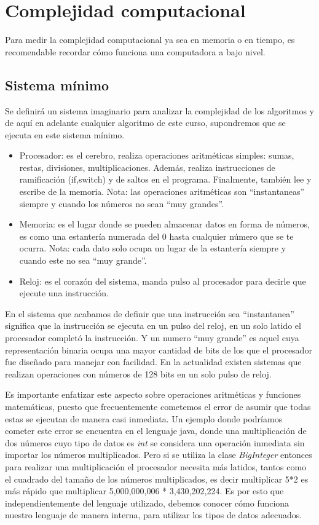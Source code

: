 \chapter{Complejidad computacional}

Para medir la complejidad computacional ya sea en memoria o en tiempo, es recomendable recordar cómo funciona una computadora a bajo nivel.

\section{Sistema mínimo}

 Se definirá un sistema imaginario para analizar la complejidad de los algoritmos y de aquí en adelante cualquier algoritmo de este curso, supondremos que se ejecuta en este sistema mínimo. 

\begin{itemize}
    \item Procesador: es el cerebro, realiza operaciones aritméticas simples: sumas, restas, divisiones, multiplicaciones. Además, realiza instrucciones de ramificación (if,switch) y de saltos en el programa. Finalmente, también lee y escribe de la memoria. Nota: las operaciones aritméticas son ``instantaneas'' siempre y cuando los números no sean ``muy grandes''.
    \item Memoria: es el lugar donde se pueden almacenar datos en forma de números, es como una estantería numerada del 0 hasta cualquier número que se te ocurra. Nota: cada dato solo ocupa un lugar de la estantería siempre y cuando este no sea ``muy grande''.
    \item Reloj: es el corazón del sistema, manda pulso al procesador para decirle que ejecute una instrucción. 
\end{itemize}

En el sistema que acabamos de definir que una instrucción sea ``instantanea'' significa que la instrucción se ejecuta en un pulso del reloj, en un solo latido el procesador completó la instrucción. Y un numero ``muy grande'' es aquel cuya representación binaria ocupa una mayor cantidad de bits de los que el procesador fue diseñado para manejar con facilidad. En la actualidad existen sistemas que realizan operaciones con números de 128 bits en un solo pulso de reloj.

Es importante enfatizar este aspecto sobre operaciones aritméticas y funciones matemáticas, puesto que frecuentemente cometemos el error de asumir que todas estas se ejecutan de manera casi inmediata. Un ejemplo donde podríamos cometer este error se encuentra en el lenguaje java, donde una multiplicación de dos números cuyo tipo de datos es \emph{int} se considera una operación inmediata sin importar los números multiplicados. Pero si se utiliza la clase \emph{BigInteger} entonces para realizar una multiplicación el procesador necesita más latidos, tantos como el cuadrado del tamaño de los números multiplicados, es decir multiplicar 5*2 es más rápido que multiplicar 5,000,000,006 *  3,430,202,224. Es por esto que independientemente del lenguaje utilizado, debemos conocer cómo funciona nuestro lenguaje de manera interna, para utilizar los tipos de datos adecuados.



